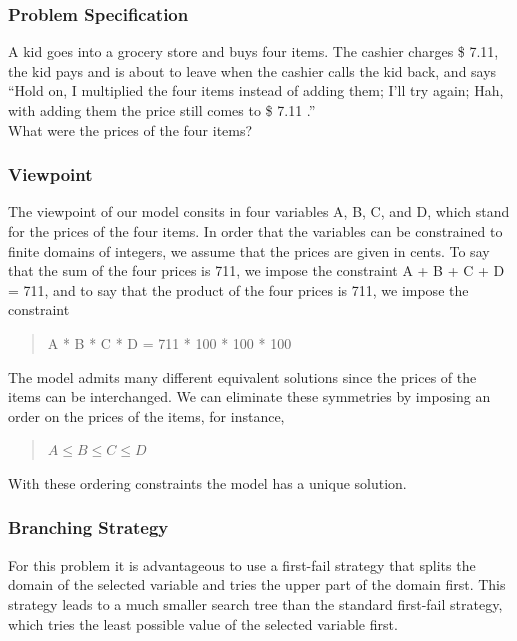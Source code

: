 \documentclass[a4paper]{scrartcl}
\begin{document}
\subsubsection{Problem Specification}
A kid goes into a grocery store and buys four items. 
The cashier charges \$ 7.11, the kid 
pays and is about to leave when the cashier calls the kid back, 
and says \\
``Hold on, I multiplied the four items instead of adding them; 
I'll try again; 
Hah, with adding them the price still comes to \$ 7.11 .'' \\
What were the prices of the four items?

\subsubsection{Viewpoint}
The viewpoint of our model consits in four variables 
A, B, C, and D, which stand for the 
prices of the four items. In order that the variables
 can be constrained 
to finite domains of integers, we assume that the prices 
are given in cents. 
To say that the sum of the four prices is 711, 
we impose the constraint A + B + C + D = 711, and to say 
that the product 
of the four prices is 711, we impose the constraint
\begin{quote}
A * B * C * D = 711 * 100 * 100 * 100
\end{quote}
The model admits many different equivalent solutions since the 
prices of 
the items can be interchanged. We can eliminate these 
symmetries by imposing an order 
on the prices of the items, for instance,
\begin{quote} 
$ A \le B \le C \le D$
\end{quote}
With these ordering constraints the model has a unique solution.

\subsubsection{Branching Strategy}
For this problem it is advantageous to use a first-fail strategy 
that splits the domain 
of the selected variable and tries the upper part of the domain 
first. This strategy leads 
to a much smaller search tree than the standard first-fail strategy, 
which tries the least 
possible value of the selected variable first. 
\end{document}
